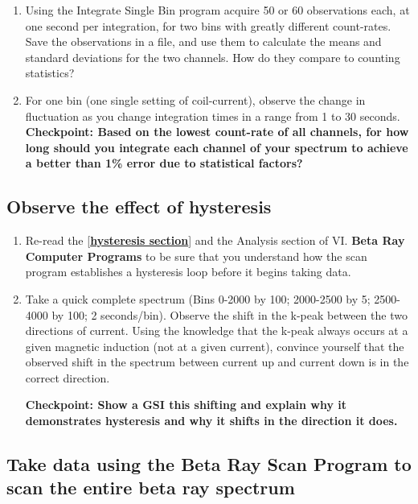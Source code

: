 \documentclass{../lab}
\begin{document}
\begin{enumerate}
    \item Using the Integrate Single Bin program acquire 50 or 60 observations each, at one second per integration, for two bins with greatly different count-rates. Save the observations in a file, and use them to calculate the means and standard deviations for the two channels. How do they compare to counting statistics?

    \item For one bin (one single setting of coil-current), observe the change in fluctuation as you change integration times in a range from 1 to 30 seconds. 
    \textbf{Checkpoint: Based on the lowest count-rate of all channels, for how long should you integrate each channel of your spectrum to achieve a better than 1\% error due to statistical factors?}
\end{enumerate}

\subsection{Observe the effect of hysteresis}

\begin{enumerate}
    \item Re-read the [\href{http://experimentationlab.berkeley.edu/Hysteresis}{\textbf{hysteresis section}}] and the Analysis section of VI. \textbf{Beta Ray Computer Programs} to be sure that you understand how the scan program establishes a hysteresis loop before it begins taking data.

    \item Take a quick complete spectrum (Bins 0-2000 by 100; 2000-2500 by 5; 2500-4000 by 100; 2 seconds/bin). Observe the shift in the k-peak between the two directions of current. Using the knowledge that the k-peak always occurs at a given magnetic induction (not at a given current), convince yourself that the observed shift in the spectrum between current up and current down is in the correct direction.
    
    \textbf{Checkpoint: Show a GSI this shifting and explain why it demonstrates hysteresis and why it shifts in the direction it does.}

\end{enumerate}

\subsection{Take data using the Beta Ray Scan Program to scan the entire beta ray spectrum}
\end{document}
